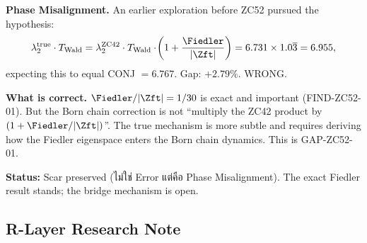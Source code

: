 \documentclass[12pt, a4paper]{article}
\begin{document}
\begin{openqbox}[title={PM-ZC52-01: Product-Correction Path
  Failed (Scar, $R_0$)}]
\textbf{Phase Misalignment.}
An earlier exploration before ZC52 pursued the hypothesis:
\[
  \lambda_2^{\rm true}\cdot T_{\rm Wald}
  = \lambda_2^{\rm ZC42}\cdot T_{\rm Wald}
    \cdot\!\left(1 + \frac{\Fiedler}{|\Zft|}\right)
  = 6.731\times1.0\overline{3}
  = 6.955,
\]
expecting this to equal CONJ $=6.767$. Gap: $+2.79\%$. WRONG.

\textbf{What is correct.}
$\Fiedler/|\Zft| = 1/30$ is exact and important (FIND-ZC52-01).
But the Born chain correction is not ``multiply the ZC42 product
by $(1+\Fiedler/|\Zft|)$''. The true mechanism is more subtle
and requires deriving how the Fiedler eigenspace enters the
Born chain dynamics. This is GAP-ZC52-01.

\textbf{Status:} Scar preserved (ไม่ใช่ Error แต่คือ Phase
Misalignment). The exact Fiedler result stands;
the bridge mechanism is open.
\end{openqbox}

\subsection{R-Layer Research Note}
\end{document}
